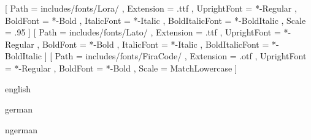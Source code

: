 \def\english{english}
\def\german{german}
\def\ngerman{ngerman}
\def\true{true}
\def\false{false}

% 
\usepackage[utf8]{inputenc}	%

\usepackage{fontspec} %
\usepackage{lmodern} %
\setmainfont{Lora}[
	Path 			= includes/fonts/Lora/ ,
	Extension		= .ttf ,
	UprightFont		= *-Regular ,
	BoldFont		= *-Bold ,
	ItalicFont		= *-Italic ,
	BoldItalicFont	= *-BoldItalic ,
	Scale			= .95
	 ]
\setsansfont{Lato}[
	Path 			= includes/fonts/Lato/ ,
	Extension		= .ttf ,
	UprightFont		= *-Regular ,
	BoldFont		= *-Bold ,
	ItalicFont		= *-Italic ,
	BoldItalicFont	= *-BoldItalic ]
\setmonofont{FiraCode}[
	Path 			= includes/fonts/FiraCode/ ,
	Extension		= .otf ,
	UprightFont		= *-Regular ,
	BoldFont		= *-Bold ,
	Scale			= MatchLowercase ]	

\ifx\doclanguage\english
		\usepackage[english]{babel}
\fi
\ifx\doclanguage\german
		\usepackage[german]{babel}
\fi
\ifx\doclanguage\ngerman
		\usepackage[ngerman]{babel}
\fi

\usepackage[left=30mm,right=20mm,top=30mm,bottom=40mm]{geometry} %

\usepackage[
	pdftoolbar=true,
	bookmarksopen,
	bookmarksnumbered=false,
	bookmarksopenlevel=1,
	pdfdisplaydoctitle,	
    colorlinks,
    citecolor=black,
    filecolor=black,
    linkcolor=black,
    urlcolor=black
]{hyperref} %

\usepackage{graphicx} %

\usepackage[margin=10pt,font=small,labelfont=bf,labelsep=endash]{caption} %

\usepackage{enumitem} %
	
\usepackage{multicol} %

